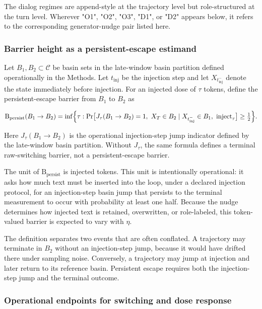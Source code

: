 \documentclass{article}
\theoremstyle{plain}
\theoremstyle{definition}
\begin{document}
The dialog regimes are append-style at the trajectory level but role-structured at the turn level. Wherever "O1", "O2", "O3", "D1", or "D2" appears below, it refers to the corresponding generator-nudge pair listed here.

\subsubsection{Barrier height as a persistent-escape estimand}

Let \(B_1,B_2 \subset \mathcal{C}\) be basin sets in the late-window basin partition defined operationally in the Methods. Let \(t_{\mathrm{inj}}\) be the injection step and let \(X_{t_{\mathrm{inj}}^-}\) denote the state immediately before injection. For an injected dose of \(\tau\) tokens, define the persistent-escape barrier from \(B_1\) to \(B_2\) as

\[\mathrm{B}_{\mathrm{persist}}(B_1 \to B_2)
=
\inf\Bigl\{\tau:
\Pr\bigl[J_\tau(B_1\to B_2)=1,\ X_T\in B_2
\mid X_{t_{\mathrm{inj}}^-}\in B_1,\ \mathrm{inject}_\tau\bigr]
\ge \tfrac12
\Bigr\}.\]

Here \(J_\tau(B_1\to B_2)\) is the operational injection-step jump indicator defined by the late-window basin partition. Without \(J_\tau\), the same formula defines a terminal raw-switching barrier, not a persistent-escape barrier.

The unit of \(\mathrm{B}_{\mathrm{persist}}\) is injected tokens. This unit is intentionally operational: it asks how much text must be inserted into the loop, under a declared injection protocol, for an injection-step basin jump that persists to the terminal measurement to occur with probability at least one half. Because the nudge determines how injected text is retained, overwritten, or role-labeled, this token-valued barrier is expected to vary with \(\eta\).

The definition separates two events that are often conflated. A trajectory may terminate in \(B_2\) without an injection-step jump, because it would have drifted there under sampling noise. Conversely, a trajectory may jump at injection and later return to its reference basin. Persistent escape requires both the injection-step jump and the terminal outcome.

\subsubsection{Operational endpoints for switching and dose response}
\end{document}
